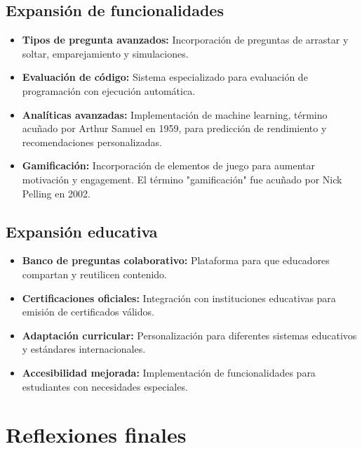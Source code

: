\documentclass[12pt,a4paper]{report}
\begin{document}
\subsection{Expansión de funcionalidades}

\begin{itemize}
\item \textbf{Tipos de pregunta avanzados:} Incorporación de preguntas de arrastar y soltar, emparejamiento y simulaciones.

\item \textbf{Evaluación de código:} Sistema especializado para evaluación de programación con ejecución automática.

\item \textbf{Analíticas avanzadas:} Implementación de machine learning, término acuñado por Arthur Samuel en 1959, para predicción de rendimiento y recomendaciones personalizadas.

\item \textbf{Gamificación:} Incorporación de elementos de juego para aumentar motivación y engagement. El término "gamificación" fue acuñado por Nick Pelling en 2002.
\end{itemize}

\subsection{Expansión educativa}

\begin{itemize}
\item \textbf{Banco de preguntas colaborativo:} Plataforma para que educadores compartan y reutilicen contenido.

\item \textbf{Certificaciones oficiales:} Integración con instituciones educativas para emisión de certificados válidos.

\item \textbf{Adaptación curricular:} Personalización para diferentes sistemas educativos y estándares internacionales.

\item \textbf{Accesibilidad mejorada:} Implementación de funcionalidades para estudiantes con necesidades especiales.
\end{itemize}

\section{Reflexiones finales}
\end{document}
